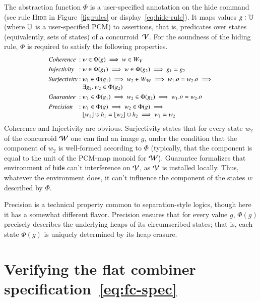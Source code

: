 The abstraction function $\Phi$ is a user-specified annotation on the
hide command (see rule \textsc{Hide} in Figure~\ref{fig:rules} or
display~\eqref{eq:hide-rule}). It maps values $g : \mathbb{U}$ (where
$\mathbb{U}$ is a user-specified PCM) to assertions, that is, predicates
over states (equivalently, sets of states) of a
concurroid~$\mathcal{V}$. For the soundness of the hiding rule, $\Phi$ is
required to satisfy the following properties.
%
\[
{\small
\begin{array}[t]{l@{\ }c@{\ }l}
\textit{Coherence} & : & w \in \Phi(g) \implies w \in W_\vcon
\\[3pt]
\textit{Injectivity} & : & w \in \Phi(g_1) \implies w \in \Phi(g_2)
\implies g_1 = g_2
\\[3pt]
\textit{Surjectivity} & : & w_1 \in \Phi(g_1) \implies w_2 \in W_\wcon
\implies w_1.\mathother = w_2.\mathother \implies \\
&&\exists g_2\ldot w_2 \in \Phi(g_2)
\\[3pt]
\textit{Guarantee} & : & w_1 \in \Phi(g_1) \implies w_2 \in \Phi(g_2)
\implies w_1.\mathother = w_2.\mathother
\\[3pt]
\textit{Precision} & : & w_1 \in \Phi(g) \implies w_2 \in \Phi(g)
\implies \\
&& \flatten {w_1} \hunion h_1 = \flatten {w_2} \hunion h_2 \implies w_1 = w_2
\end{array}
}
\]
%
Coherence and Injectivity are obvious. Surjectivity states that for
every state $w_2$ of the concurroid $\mathcal{W}$ one can find an image $g$,
under the condition that the \other component of $w_2$ is well-formed
according to $\Phi$ (typically, that the \other component is equal to
the unit of the PCM-map monoid for $\mathcal{W}$). Guarantee formalizes that
environment of $\mathsf{hide}$ can't interference on $\mathcal{V}$, as
$\mathcal{V}$ is installed locally. Thus, whatever the environment does, it
can't influence the \other component of the states $w$ described by
$\Phi$.

Precision is a technical property common to separation-style logics,
though here it has a somewhat different flavor. Precision ensures that
for every value $g$, $\Phi(g)$ precisely describes the underlying
heaps of its circumscribed states; that is, each state $\Phi(g)$ is
uniquely determined by its heap erasure.

\section{Verifying the flat combiner specification~\eqref{eq:fc-spec}}
\label{sec:verifying-fc}

